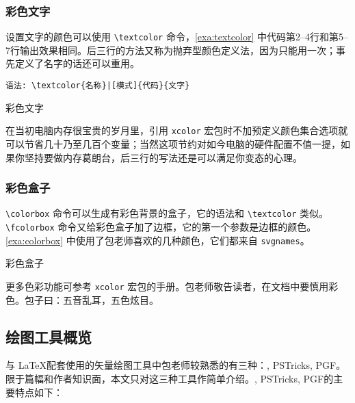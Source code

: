 \subsubsection{彩色文字}

设置文字的颜色可以使用 \verb|\textcolor| 命令，\autoref{exa:textcolor} 中代码第2--4行和第5--7行输出效果相同。后三行的方法又称为抛弃型颜色定义法，因为只能用一次；事先定义了名字的话还可以重用。

\verb+语法: \textcolor{名称}|[模式]{代码}{文字}+

\begin{example}[h]
\caption{彩色文字}
\label{exa:textcolor}
\end{example}

在当初电脑内存很宝贵的岁月里，引用 \texttt{xcolor} 宏包时不加预定义颜色集合选项就可以节省几十乃至几百个变量；当然这项节约对如今电脑的硬件配置不值一提，如果你坚持要做内存葛朗台，后三行的写法还是可以满足你变态的心理。

\subsubsection{彩色盒子}

\verb|\colorbox| 命令可以生成有彩色背景的盒子，它的语法和 \verb|\textcolor| 类似。\verb|\fcolorbox| 命令又给彩色盒子加了边框，它的第一个参数是边框的颜色。\autoref{exa:colorbox} 中使用了包老师喜欢的几种颜色，它们都来自 \texttt{svgnames}。

\begin{example}[h]
\begin{BTDemo}[numbers=left]
\colorbox{Lavender}{}
\colorbox{SkyBlue}{}
\colorbox{Wheat}{}
\end{BTDemo}
\caption{彩色盒子}
\label{exa:colorbox}
\end{example}

更多色彩功能可参考 \texttt{xcolor} 宏包的手册\citep{Kern_2007}。包老师敬告读者，在文档中要慎用彩色。包子曰：五音乱耳，五色炫目。

\subsection{绘图工具概览}
\label{sec:graph_tools}

与 \LaTeX 配套使用的矢量绘图工具中包老师较熟悉的有三种：\MP, PSTricks, PGF。限于篇幅和作者知识面，本文只对这三种工具作简单介绍。\MP, PSTricks, PGF的主要特点如下：

